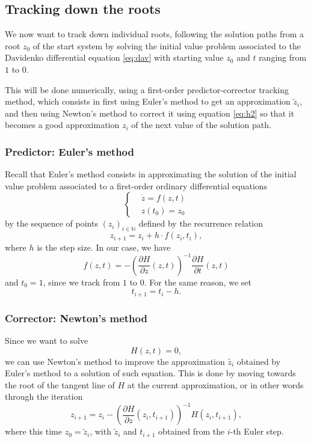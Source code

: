 \documentclass[a4paper]{article}
\newcommand{\N}{\mathbb{N}}
\theoremstyle{definition}
\theoremstyle{definition}
\theoremstyle{remark}
\theoremstyle{definition}
\begin{document}
\subsection{Tracking down the roots}
We now want to track down individual roots, following the solution paths from
a root $z_0$ of the start system by solving the initial value problem associated to the Davidenko differential equation \eqref{eq:dav} with starting value $z_0$ and
$t$ ranging from $1$ to $0$.

This will be done numerically, using a first-order predictor-corrector tracking method, which consists in first using Euler's method to get an approximation
$\widetilde{z}_i$, and then using Newton's method to correct it
using equation \eqref{eq:h2} so that it becomes a good approximation $z_i$ of the next value of the solution path.
\subsubsection{Predictor: Euler's method}
Recall that Euler's method consists in approximating the solution of the initial value problem associated to a first-order ordinary differential equations
\begin{equation*}
    \left\{
        \begin{aligned}
            &\dot{z}=f(z,t)\\
            &z(t_0)=z_0
        \end{aligned}
    \right.
\end{equation*}
by the sequence of points $(z_i)_{i\in\N}$ defined by the recurrence relation
$$ z_{i+1}=z_i+h\cdot f(z_i,t_i) ,$$
where $h$ is the step size.
In our case, we have $$f(z,t)=-\left(\frac{\partial H}{\partial z}(z,t)\right)^{-1}\frac{\partial H}{\partial t}(z,t)$$ and $t_0=1$, since we track from $1$ to $0$. For the same
reason, we set $$t_{i+1}=t_i-h.$$
\subsubsection{Corrector: Newton's method}
Since we want to solve $$H(z,t)=0,$$ we can use Newton's method to improve the approximation $\widetilde{z_i}$ obtained by Euler's method to a solution of such equation.
This is done by moving towards the root of the tangent line of $H$ at the current approximation, or in other words through the iteration
$$ z_{i+1}=z_i-\left(\frac{\partial H}{\partial z}(z_i,t_{i+1})\right)^{-1}H(z_i,t_{i+1}) ,$$
where this time $z_0=\widetilde{z}_i$, with $\widetilde{z}_i$ and $t_{i+1}$ obtained from the $i$-th Euler step.
\end{document}
